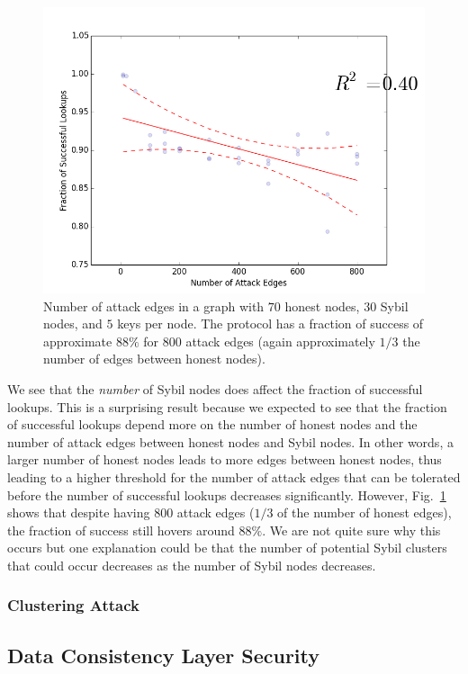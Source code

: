 \documentclass[letter]{article}
\begin{document}
\begin{figure}[!h]
\centering
\includegraphics[width=0.9\columnwidth]{sybilattackedges30}
\caption{Number of attack edges in a graph with $70$ honest nodes, $30$ Sybil nodes, and $5$ keys per node. The protocol has a fraction of success of approximate $88\%$ for $800$ attack edges (again approximately $1/3$ the number of edges between honest nodes).}
\label{fig:sybilattackedges30}
\end{figure}

We see that the \emph{number} of Sybil nodes does affect the fraction of successful lookups. This is a surprising result because we expected to see that the fraction of successful lookups depend more on the number of honest nodes and the number of attack edges between honest nodes and Sybil nodes. In other words, a larger number of honest nodes leads to more edges between honest nodes, thus leading to a higher threshold for the number of attack edges that can be tolerated before the number of successful lookups decreases significantly. However, Fig.~\ref{fig:sybilattackedges30} shows that despite having $800$ attack edges ($1/3$ of the number of honest edges), the fraction of success still hovers around $88\%$. We are not quite sure why this occurs but one explanation could be that the number of potential Sybil clusters that could occur decreases as the number of Sybil nodes decreases.

\subsubsection{Clustering Attack}

\subsection{Data Consistency Layer Security}
\end{document}
